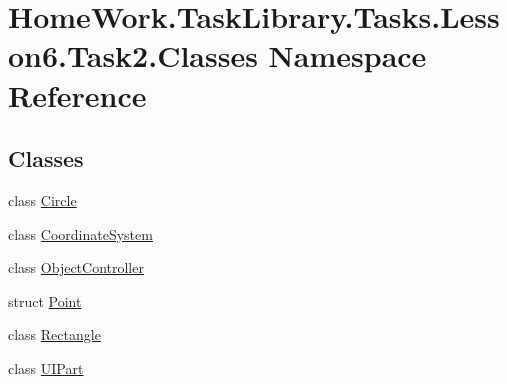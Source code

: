 \hypertarget{namespace_home_work_1_1_task_library_1_1_tasks_1_1_lesson6_1_1_task2_1_1_classes}{}\section{Home\+Work.\+Task\+Library.\+Tasks.\+Lesson6.\+Task2.\+Classes Namespace Reference}
\label{namespace_home_work_1_1_task_library_1_1_tasks_1_1_lesson6_1_1_task2_1_1_classes}
\subsection*{Classes}
\begin{DoxyCompactItemize}
\item 
class \mbox{\hyperlink{class_home_work_1_1_task_library_1_1_tasks_1_1_lesson6_1_1_task2_1_1_classes_1_1_circle}{Circle}}
\item 
class \mbox{\hyperlink{class_home_work_1_1_task_library_1_1_tasks_1_1_lesson6_1_1_task2_1_1_classes_1_1_coordinate_system}{Coordinate\+System}}
\item 
class \mbox{\hyperlink{class_home_work_1_1_task_library_1_1_tasks_1_1_lesson6_1_1_task2_1_1_classes_1_1_object_controller}{Object\+Controller}}
\item 
struct \mbox{\hyperlink{struct_home_work_1_1_task_library_1_1_tasks_1_1_lesson6_1_1_task2_1_1_classes_1_1_point}{Point}}
\item 
class \mbox{\hyperlink{class_home_work_1_1_task_library_1_1_tasks_1_1_lesson6_1_1_task2_1_1_classes_1_1_rectangle}{Rectangle}}
\item 
class \mbox{\hyperlink{class_home_work_1_1_task_library_1_1_tasks_1_1_lesson6_1_1_task2_1_1_classes_1_1_u_i_part}{U\+I\+Part}}
\end{DoxyCompactItemize}

